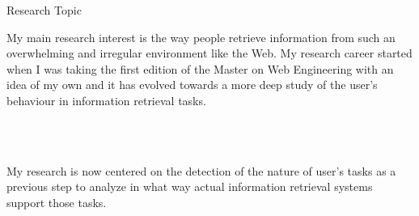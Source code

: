 
\begin{rubric}{Research Topic}

\parbox{\textwidth}{My main research interest is the way people retrieve information from such an overwhelming and irregular environment like the Web. My research career started when I was taking the first edition of the Master on Web Engineering with an idea of my own and it has evolved towards a more deep study of the user's behaviour in information retrieval tasks.}
\\
\\
\parbox{\textwidth}{My research is now centered on the detection of the nature of user's tasks as a previous step to analyze in what way actual information retrieval systems support those tasks.}

\end{rubric}